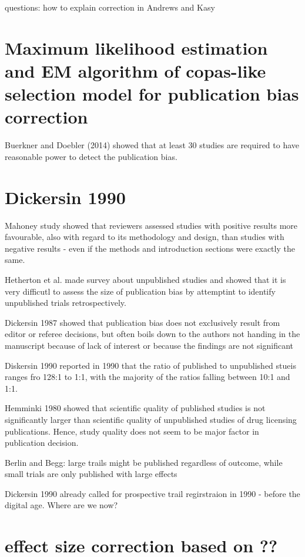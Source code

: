 questions: how to explain correction in Andrews and Kasy

\section{Maximum likelihood estimation and EM algorithm of copas-like selection model for publication bias correction}
Buerkner and Doebler (2014) showed that at least 30 studies are required to have reasonable power to detect the publication bias.

\section{Dickersin 1990}
Mahoney study showed that reviewers assessed studies with positive results more favourable, also with regard to its methodology and design, than studies with negative results - even if the methods and introduction sections were exactly the same.\par

Hetherton et al. made survey about unpublished studies and showed that it is very difficutl to assess the size of publication bias by attemptint to identify unpublished trials retrospectively.\par

Dickersin 1987 showed that publication bias does not exclusively result from editor or referee decisions, but often boils down to the authors not handing in the manuscript because of lack of interest or because the findings are not significant

Diskersin 1990 reported in 1990 that the ratio of published to unpublished stueis ranges fro 128:1 to 1:1, with the majority of the ratios falling between 10:1 and 1:1.

Hemminki 1980 showed that scientific quality of published studies is not significantly larger than scientific quality of unpublished studies of drug licensing publications. Hence, study quality does not seem to be major factor in publication decision.\par

Berlin and Begg: large trails might be published regardless of outcome, while small trials are only published with large effects

Dickersin 1990 already called for prospective trail regirstraion in 1990 - before the digital age. Where are we now?



\section{effect size correction based on ??}